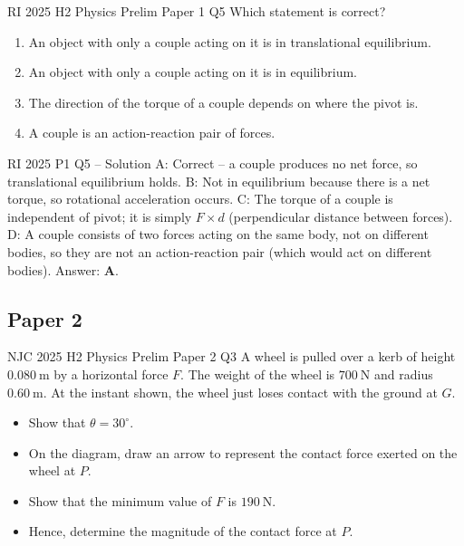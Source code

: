 \documentclass[11pt]{beamer}
\begin{document}
\begin{frame}[shrink=15]{RI 2025 H2 Physics Prelim Paper 1 Q5}
Which statement is correct?
\begin{enumerate}[A]
    \item An object with only a couple acting on it is in translational equilibrium.
    \item An object with only a couple acting on it is in equilibrium.
    \item The direction of the torque of a couple depends on where the pivot is.
    \item A couple is an action-reaction pair of forces.
\end{enumerate}
\end{frame}

\begin{frame}{RI 2025 P1 Q5 – Solution}
A: Correct – a couple produces no net force, so translational equilibrium holds.
B: Not in equilibrium because there is a net torque, so rotational acceleration occurs.
C: The torque of a couple is independent of pivot; it is simply $F \times d$ (perpendicular distance between forces).
D: A couple consists of two forces acting on the same body, not on different bodies, so they are not an action-reaction pair (which would act on different bodies).
Answer: \textbf{A}.
\end{frame}

\subsection{Paper 2}

\begin{frame}[shrink=15]{NJC 2025 H2 Physics Prelim Paper 2 Q3}
A wheel is pulled over a kerb of height $0.080\ \mathrm{m}$ by a horizontal force $F$. The weight of the wheel is $700\ \mathrm{N}$ and radius $0.60\ \mathrm{m}$. At the instant shown, the wheel just loses contact with the ground at $G$.
\begin{itemize}
    \item[(a)] Show that $\theta = 30^\circ$.
    \item[(b)] On the diagram, draw an arrow to represent the contact force exerted on the wheel at $P$.
    \item[(c)] Show that the minimum value of $F$ is $190\ \mathrm{N}$.
    \item[(d)] Hence, determine the magnitude of the contact force at $P$.
\end{itemize}
\end{frame}
\end{document}

